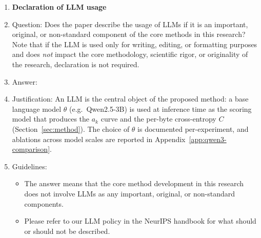 \begin{enumerate}
\item {\bf Declaration of LLM usage}
    \item[] Question: Does the paper describe the usage of LLMs if it is an important, original, or non-standard component of the core methods in this research? Note that if the LLM is used only for writing, editing, or formatting purposes and does \emph{not} impact the core methodology, scientific rigor, or originality of the research, declaration is not required.
    \item[] Answer: \answerYes{}
    \item[] Justification: An LLM is the central object of the proposed method: a base language model $\theta$ (e.g.\ Qwen2.5-3B) is used at inference time as the scoring model that produces the $a_k$ curve and the per-byte cross-entropy $C$ (Section~\ref{sec:method}). The choice of $\theta$ is documented per-experiment, and ablations across model scales are reported in Appendix~\ref{app:qwen3-comparison}.
    \item[] Guidelines:
    \begin{itemize}
        \item The answer \answerNA{} means that the core method development in this research does not involve LLMs as any important, original, or non-standard components.
        \item Please refer to our LLM policy in the NeurIPS handbook for what should or should not be described.
    \end{itemize}

\end{enumerate}
